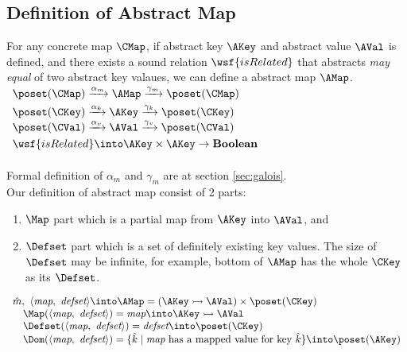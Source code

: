 \subsection{Definition of Abstract Map}
For any concrete map $\CMap$,
if abstract key $\AKey$ and abstract value $\AVal$ is defined,
and there exists a sound relation $\wsf{isRelated}$ 
that abstracts \emph{may equal} of two abstract key valaues,
we can define a abstract map $\AMap$.\\

$\begin{array}{l}
\poset(\CMap) \xrightarrow{\alpha_{m}}
\AMap \xrightarrow{\gamma_{m}} \poset(\CMap) \vspace{1mm} \\
\poset(\CKey) \xrightarrow{\alpha_{k}} 
\AKey \xrightarrow{\gamma_{k}} \poset(\CKey) \\
\poset(\CVal) \xrightarrow{\alpha_{v}} 
\AVal \xrightarrow{\gamma_{v}} \poset(\CVal) \vspace{1mm} \\
\wsf{isRelated} \into \AKey \times \AKey \rightarrow \textbf{Boolean} \\
\end{array}$\\\\
Formal definition of $\alpha_m$ and $\gamma_m$ are at section \ref{sec:galois}.\\
Our definition of abstract map consist of 2 parts:
\begin{enumerate}
\item $\Map$ part which is a partial map from $\AKey$ into $\AVal$, and
\item $\Defset$ part which is a set of definitely existing key values.
The size of $\Defset$ may be infinite, 
for example, bottom of $\AMap$ has the whole $\CKey$ as its $\Defset$.
\end{enumerate}
$\begin{array}{l}
\hat{m},\ \langle \emph{map},\ \emph{defset} \rangle
\into \AMap = (\AKey \rightarrowtail \AVal)
\times \poset(\CKey)\\
\quad \Map(\langle \emph{map},\ \emph{defset} \rangle) = 
\emph{map} \into \AKey \rightarrowtail \AVal \\
\quad \Defset(\langle \emph{map},\ \emph{defset} \rangle) = 
\emph{defset} \into \poset(\CKey) \\
\quad \Dom(\langle \emph{map},\ \emph{defset} \rangle) = 
\{ \hat{k} \mid \emph{map} 
\textrm{ has a mapped value for key } \hat{k} \} \into \poset(\AKey) \\
\end{array}$

